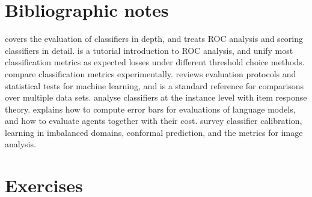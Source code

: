 \section*{Bibliographic notes}

\citet{japkowicz2011evaluating} covers the evaluation of classifiers in depth,
and \citet{flach2012machine} treats ROC analysis and scoring
classifiers in detail. \citet{fawcett2006introduction} is a tutorial introduction to ROC
analysis, and \citet{hernandez2012unified} unify most classification metrics as expected losses
under different threshold choice methods. \citet{ferri2009experimental} compare classification
metrics experimentally. \citet{raschka2018model} reviews evaluation protocols and statistical
tests for machine learning, and \citet{demsar2006statistical} is a standard reference for comparisons
over multiple data sets. \citet{martinezplumed2019item} analyse classifiers at the instance level with item response
theory. \citet{miller2024adding} explains how to compute error bars for evaluations of language models, and
\citet{kapoor2025agents} how to evaluate agents together with their cost. \citet{silvafilho2023classifier} survey classifier calibration,
\citet{branco2016survey} learning in imbalanced domains, \citet{angelopoulos2023conformal}
conformal prediction, and \citet{maierhein2024metrics} the metrics for image analysis.

\section*{Exercises}

